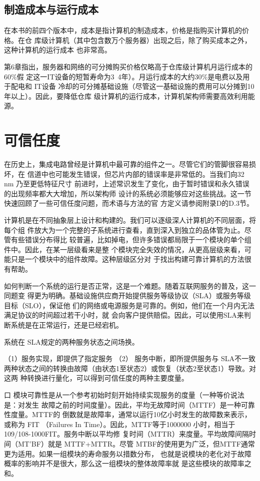 \subsection{制造成本与运行成本}
在本书的前四个版本中，成本是指计算机的制造成本，价格是指购买计算机的价格。在仓
库级计算机（其中包含数万个服务器）出现之后，除了购买成本之外，这种计算机的运行成本
也非常高。

第6章指出，服务器和网络的可分摊购买价格仅略高于仓库级计算机月运行成本的60\%假
定这一IT设备的短暂寿命为3~4年）。月运行成本的大约30\%是电费以及用于配电和 IT设备
冷却的可分摊基础设施（尽管这一基础设施的费用可以分摊到10年以上）。因此，要降低仓库
级计算机的运行成本，计算机架构师需要高效利用能源。

\section{可信任度}
在历史上，集成电路曾经是计算机中最可靠的组件之一。尽管它们的管脚很容易损坏，在
信道中也可能发生错误，但芯片内部的错误率是非常低的。当我们向32 nm 乃至更低特征尺寸
前进时，上述常识发生了变化，由于暂时错误和永久错误的出现频率都大大增加，所以架构师
设计的系统必须能够应对这些挑战。这一节快速回顾了一些可信任度问题，而术语与方法的官
方定义请参阅附录D的D.3节。

计算机是在不同抽象层上设计和构建的。我们可以逐级深人计算机的不同层面，将每个组
件放大为一个完整的子系统进行查看，直到深入到独立的品体管为止。尽管有些错误分布得比
较普遍，比如掉电，但许多错误都局限于一个模块的单个组件中。因此，在某一层级看来是整
个模块完全失效的情况，从更高层级来看，可能只是一个模块中的组件故障。这种层级区分对
于找出构建可靠计算机的方法很有帮助。

如何判断一个系统的运行是否正常，这是一个难题。随着互联网服务的普及，这一同题变
得更为明确。基础设施供应商开始提供服务等级协议（SLA）或服务等级目标（SLO），保证他
们的网络或电源服务是可靠的。例如，他们在一个月内无法满足协议的时间超过若干小时，就
会向客户提供赔偿。因此，可以使用SLA来判断系统是在正常运行，还是已经宕机。

系统在 SLA规定的两种服务状态之间场换。

（1）服务实现，即提供了指定服务
（2） 服务中断，即所提供服务与 SLA不一致
两种状态之间的转换由故障（由状态1至状态2）或恢复（状态2至状态1）导致。对这两
种转换进行量化，可以得到可信任度的两种主要度量。

口 模块可靠性是从一个参考初始时刻开始持续实现服务的度量（一种等价说法是：对发生
故障之前的时间度量）。因此，平均无故障时间（MTTF）是一种可靠性度量。MTTF的
倒数就是故障率，通常以运行10亿小时发生的故障数来表示，或称为 FIT （Failures In
Time）。因此，MTTF等于1000000 小时，相当于109/108-1000FIT。服务中断以平均修
复时间（MTTR）来度量。平均故障间隔时间（MT'BF）就是 MTTF+MTTR。尽管
MTBF的使用更为广泛，但MTTF通常更为适用。如果一组模块的寿命服务以措数分布，
也就是说模块的老化对于故障概率的影响并不是很大，那么这一组模块的整体故障率就
是这些模块的故障率之和。

